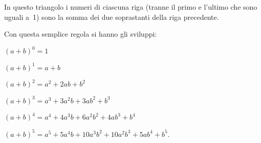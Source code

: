 In questo triangolo i numeri di ciascuna riga (tranne il primo e
l'ultimo che sono uguali a~1) sono la somma dei due
soprastanti della riga precedente.

Con questa semplice regola si hanno gli sviluppi:

\begin{itemize*}
\item $(a+b)^{0}=1$
\item $(a+b)^{1}=a+b$
\item $(a+b)^{2}=a^{2}+2{ab}+b^{2}$
\item $(a+b)^{3}=a^{3}+3a^{2}b+3{ab}^{2}+b^{3}$
\item $(a+b)^{4}=a^{4}+4a^{3}b+6a^{2}b^{2}+4{ab}^{3}+b^{4}$
\item $(a+b)^{5}=a^{5}+5a^{4}b+10a^{3}b^{2}+10a^{2}b^{3}+5{ab}^{4}+b^{5}$.
\end{itemize*}



